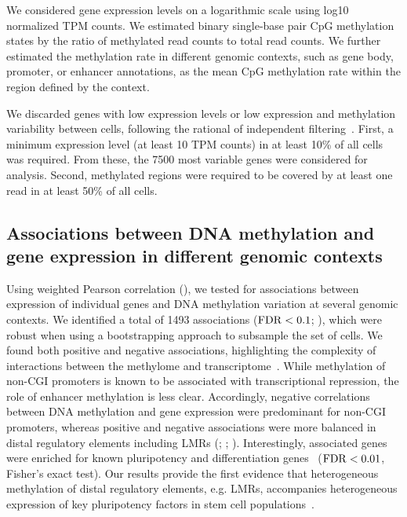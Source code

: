 We considered gene expression levels on a logarithmic scale using log10 normalized TPM counts. We estimated binary single-base pair CpG methylation states by the ratio of methylated read counts to total read counts. We further estimated the methylation rate in different genomic contexts, such as gene body, promoter, or enhancer annotations, as the mean CpG methylation rate within the region defined by the context.

We discarded genes with low expression levels or low expression and methylation variability between cells, following the rational of independent filtering~\citep{bourgon_independent_2010}. First, a minimum expression level (at least 10 TPM counts) in at least 10\% of all cells was required. From these, the 7500 most variable genes were considered for analysis. Second, methylated regions were required to be covered by at least one read in at least 50\% of all cells.


\subsection{Associations between DNA methylation and gene expression in different genomic contexts} \label{sec:mt_results}

Using weighted Pearson correlation (), we tested for associations between expression of individual genes and DNA methylation variation at several genomic contexts. We identified a total of 1493 associations ($\operatorname{FDR}<0.1$; ), which were robust when using a bootstrapping approach to subsample the set of cells. We found both positive and negative associations, highlighting the complexity of interactions between the methylome and transcriptome~\citep{dey_integrated_2015}. While methylation of non-CGI promoters is known to be associated with transcriptional repression, the role of enhancer methylation is less clear. Accordingly, negative correlations between DNA methylation and gene expression were predominant for non-CGI promoters, whereas positive and negative associations were more balanced in distal regulatory elements including LMRs (; ; ). Interestingly, associated genes were enriched for known pluripotency and differentiation genes~\citep{kolodziejczyk_single_2015} ($\operatorname{FDR}<0.01$, Fisher's exact test). Our results provide the first evidence that heterogeneous methylation of distal regulatory elements, e.g. LMRs, accompanies heterogeneous expression of key pluripotency factors in stem cell populations~\citep{lee_reprogramming_2014}.


